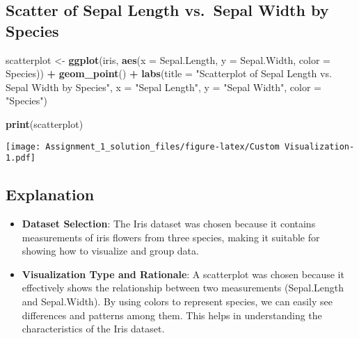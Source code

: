 \documentclass[
]{article}
\newenvironment{Shaded}{\begin{snugshade}}{\end{snugshade}}
\newcommand{\AttributeTok}[1]{\textcolor[rgb]{0.13,0.29,0.53}{#1}}
\newcommand{\FunctionTok}[1]{\textcolor[rgb]{0.13,0.29,0.53}{\textbf{#1}}}
\newcommand{\NormalTok}[1]{#1}
\newcommand{\OtherTok}[1]{\textcolor[rgb]{0.56,0.35,0.01}{#1}}
\newcommand{\SpecialCharTok}[1]{\textcolor[rgb]{0.81,0.36,0.00}{\textbf{#1}}}
\newcommand{\StringTok}[1]{\textcolor[rgb]{0.31,0.60,0.02}{#1}}
\begin{document}
\hypertarget{scatter-of-sepal-length-vs.-sepal-width-by-species}{%
\subsection{Scatter of Sepal Length vs.~Sepal Width by
Species}\label{scatter-of-sepal-length-vs.-sepal-width-by-species}}

\begin{Shaded}
\begin{Highlighting}[]
\NormalTok{scatterplot }\OtherTok{\textless{}{-}} \FunctionTok{ggplot}\NormalTok{(iris, }\FunctionTok{aes}\NormalTok{(}\AttributeTok{x =}\NormalTok{ Sepal.Length, }\AttributeTok{y =}\NormalTok{ Sepal.Width, }\AttributeTok{color =}\NormalTok{ Species)) }\SpecialCharTok{+}
               \FunctionTok{geom\_point}\NormalTok{() }\SpecialCharTok{+}
               \FunctionTok{labs}\NormalTok{(}\AttributeTok{title =} \StringTok{"Scatterplot of Sepal Length vs. Sepal Width by Species"}\NormalTok{,}
                    \AttributeTok{x =} \StringTok{"Sepal Length"}\NormalTok{, }\AttributeTok{y =} \StringTok{"Sepal Width"}\NormalTok{, }\AttributeTok{color =} \StringTok{"Species"}\NormalTok{)}

\FunctionTok{print}\NormalTok{(scatterplot)}
\end{Highlighting}
\end{Shaded}

\texttt{[image: Assignment\_1\_solution\_files/figure-latex/Custom Visualization-1.pdf]}

\hypertarget{explanation}{%
\subsection{Explanation}\label{explanation}}

\begin{itemize}
\item
  \textbf{Dataset Selection}: The Iris dataset was chosen because it
  contains measurements of iris flowers from three species, making it
  suitable for showing how to visualize and group data.
\item
  \textbf{Visualization Type and Rationale}: A scatterplot was chosen
  because it effectively shows the relationship between two measurements
  (Sepal.Length and Sepal.Width). By using colors to represent species,
  we can easily see differences and patterns among them. This helps in
  understanding the characteristics of the Iris dataset.
\end{itemize}
\end{document}
